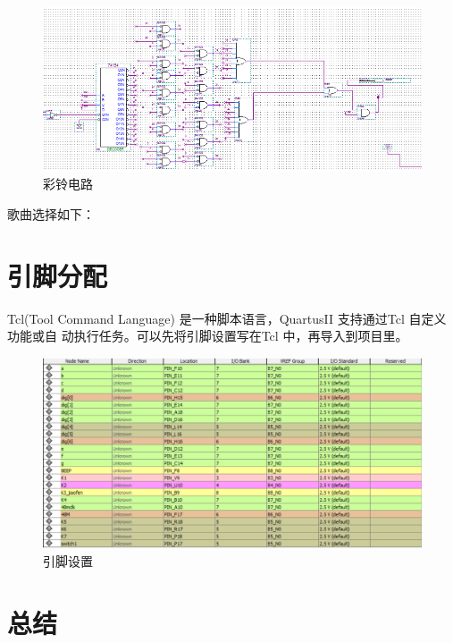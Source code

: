 \documentclass[twoside, openright]{article}
\begin{document}
\begin{figure}[htbp]
	\centering
	\includegraphics[width = \linewidth]{music.png}
	\caption{彩铃电路}
	\label{fig:彩铃电路}
\end{figure}

\newpage

歌曲选择如下：

\begin{score}
	
\end{score}

\section{引脚分配}%
\label{sec:引脚分配}

Tcl(Tool Command Language) 是一种脚本语言，QuartusII 支持通过Tcl 自定义功能或自
动执行任务。可以先将引脚设置写在Tcl 中，再导入到项目里。


\begin{figure}[htbp]
	\centering
	\includegraphics[width = 0.8\linewidth]{pin.png}
	\caption{引脚设置}
	\label{fig:引脚设置}
\end{figure}

\newpage

\section{总结}%
\label{sec:总结}
\end{document}
